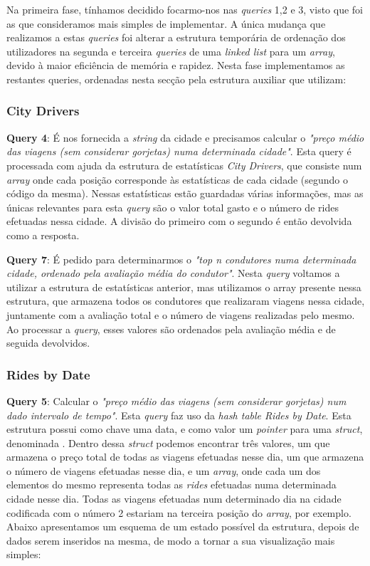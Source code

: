 \documentclass[12pt,a4paper]{report}
\begin{document}
    \par Na primeira fase, tínhamos decidido focarmo-nos nas \textit{queries} 1,2 e 3, visto que foi as que consideramos mais simples de implementar. A única mudança que realizamos a estas \textit{queries} foi alterar a estrutura temporária de ordenação dos utilizadores na segunda e terceira \textit{queries} de uma \textit{linked list} para um \textit{array}, devido à maior eficiência de memória e rapidez. Nesta fase implementamos as restantes queries, ordenadas nesta secção pela estrutura auxiliar que utilizam:
    \subsubsection{City Drivers}
    \par \textbf{Query 4}: É nos fornecida a \textit{string} da cidade e precisamos calcular o \textit{"preço médio das viagens (sem considerar gorjetas) numa determinada cidade"}.
    Esta query é processada com ajuda da estrutura de estatísticas \textit{City Drivers}, que consiste num \textit{array} onde cada posição corresponde às estatísticas de cada cidade (segundo o código da mesma). Nessas estatísticas estão guardadas várias informações, mas as únicas relevantes para esta \textit{query} são o valor total gasto e o número de rides efetuadas nessa cidade. A divisão do primeiro com o segundo é então devolvida como a resposta.
    \par \textbf{Query 7}: É pedido para determinarmos o \textit{"top n condutores numa determinada cidade, ordenado pela avaliação média do condutor"}. Nesta \textit{query} voltamos a utilizar a estrutura de estatísticas anterior, mas utilizamos o array presente nessa estrutura, que armazena todos os condutores que realizaram viagens nessa cidade, juntamente com a avaliação total e o número de viagens realizadas pelo mesmo. Ao processar a \textit{query}, esses valores são ordenados pela avaliação média e de seguida devolvidos.
    \subsubsection{Rides by Date}
    \par \textbf{Query 5}: Calcular o \textit{"preço médio das viagens (sem considerar gorjetas) num dado intervalo de tempo"}. Esta \textit{query} faz uso da \textit{hash table Rides by Date}. Esta estrutura possui como chave uma data, e como valor um \textit{pointer} para uma \textit{struct}, denominada . Dentro dessa \textit{struct} podemos encontrar três valores, um que armazena o preço total de todas as viagens efetuadas nesse dia, um que armazena o número de viagens efetuadas nesse dia, e um \textit{array}, onde cada um dos elementos do mesmo representa todas as \textit{rides} efetuadas numa determinada cidade nesse dia. Todas as viagens efetuadas num determinado dia na cidade codificada com o número 2 estariam na terceira posição do \textit{array}, por exemplo. Abaixo apresentamos um esquema de um estado possível da estrutura, depois de dados serem inseridos na mesma, de modo a tornar a sua visualização mais simples:\\
    
\end{document}
